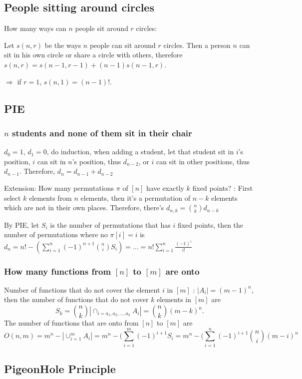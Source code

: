 \documentclass[12pt,a4paper]{ctexrep}
\begin{document}
\subsection{People sitting around circles}
How many ways can $n$ people sit around $r$ circles: 

Let $s(n,r)$ be the ways $n$ people can sit around $r$ circles. Then a person $n$ can sit in his own circle or share a circle with others, therefore $s(n,r) = s(n-1,r-1)+(n-1)s(n-1,r)$.

$\Rightarrow$ if $r=1$, $s(n,1)=(n-1)!$.

\subsection{PIE}
\subsubsection{$n$ students and none of them sit in their chair}
$d_0=1$, $d_1=0$, do induction, when adding a student, let that student sit in $i$'s position, $i$ can sit in $n$'s position, thus $d_{n-2}$, or $i$ can sit in other positions, thus $d_{n-1}$. Therefore, $d_n=d_{n-1}+d_{n-2}$

Extension: How many permutations $\pi$ of $[n]$ have exactly $k$ fixed points? : First select $k$ elements from $n$ elements, then it's a permutation of $n-k$ elements which are not in their own places. Therefore, there's $d_{n,k}=\binom{n}{k} d_{n-k}$

By PIE, let $S_i$ is the number of permutations that has $i$ fixed points, then the number of permutations where no $\pi[i]=i$ is $d_n=n! - (\sum_{i=1}^n (-1)^{n+1}\binom{n}{i} S_i) = \dots = n! \sum_{i=1}^n \frac{(-1)^{i}}{i!}$

\subsubsection{How many functions from $[n]$ to $[m]$ are onto}
Number of functions that do not cover the element $i$ in $[m]$ : $|A_i| = (m-1)^n$, then the number of functions that do not cover $k$ elements in $[m]$ are \[S_k = \binom{n}{k} |\cap_{i=a_1,a_2,\dots,a_k} A_i| = \binom{n}{k} (m-k)^n.\] The number of functions that are onto from $[n]$ to $[m]$ are \[O(n,m) = m^n-|\cup_{i=1}^m A_i| = m^n-(\sum_{i=1}^m (-1)^{i+1} S_i = m^n-(\sum_{i=1}^n (-1)^{i+1} \binom{n}{i}(m-i)^n\]

\subsection{PigeonHole Principle}
\end{document}
